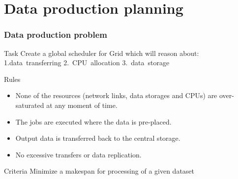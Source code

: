 \documentclass{beamer}
\begin{document}
\section{Data production planning}
\begin{frame}\frametitle{Data production problem}

\begin{block}{Task}
Create a global scheduler for Grid which will reason about:\\
\hspace{1cm} 1.data~transferring \hspace{1cm} 2.~CPU~allocation\hspace{1cm} 3.~data~storage  
\end{block}
\begin{block}{Rules}  
		\begin{itemize}
			\item None of the resources (network links, data storages and CPUs) are over-saturated at any moment of time.
			\item The jobs are executed  where the data is pre-placed.
			\item Output data is transferred back to the central storage.
			\item No excessive transfers or data replication.
		\end{itemize}
\end{block}
	
\begin{block}{Criteria}
Minimize a makespan for processing of a given dataset 
\end{block}
	
\end{frame}
\end{document}
